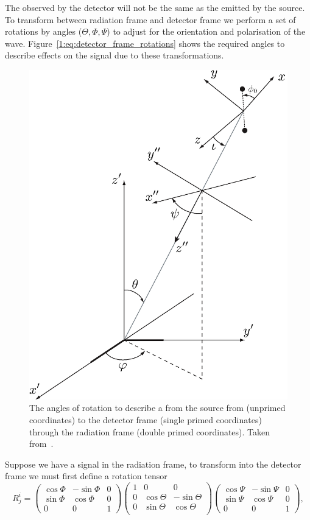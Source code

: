 The \gw observed by the detector will not be the same as the \gw emitted by the source. To transform between radiation frame and detector frame we perform a set of rotations by angles ($\Theta, \Phi, \Psi$) to adjust for the orientation and polarisation of the wave. Figure~\ref{1:eq:detector_frame_rotations} shows the required angles to describe effects on the \gwadj signal due to these transformations.
%
\begin{figure}
    \centering
    \includegraphics[width=0.75\linewidth]{images/1_general_relativity/gravitational_wave_detection/euler.png}
    \caption{The angles of rotation to describe a \gw from the source from (unprimed coordinates) to the detector frame (single primed coordinates) through the radiation frame (double primed coordinates). Taken from~\cite{Brown_Thesis:2004}.}
    \label{1:fig:source_to_detector_frame}
\end{figure}
%
Suppose we have a \gwadj signal in the radiation frame, to transform into the detector frame we must first define a rotation tensor
%
\begin{equation}
    R^{i}_{j} = 
    \begin{pmatrix}
        \cos\Phi & -\sin\Phi & 0 \\
        \sin\Phi &  \cos\Phi & 0 \\
        0        &  0        & 1
    \end{pmatrix}
    \begin{pmatrix}
        1 & 0 & 0 \\
        0 & \cos\Theta & -\sin\Theta \\
        0 & \sin\Theta & \cos\Theta \\
    \end{pmatrix}
    \begin{pmatrix}
        \cos\Psi & -\sin\Psi & 0 \\
        \sin\Psi &  \cos\Psi & 0 \\
        0        &  0        & 1
    \end{pmatrix},
    \label{1:eq:detector_frame_rotations}
\end{equation}
